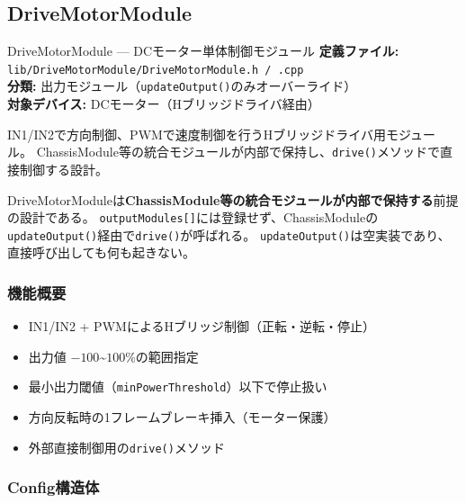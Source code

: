 \subsection{DriveMotorModule}

\begin{apibox}{DriveMotorModule --- DCモーター単体制御モジュール}
\textbf{定義ファイル:} \texttt{lib/DriveMotorModule/DriveMotorModule.h / .cpp}\\
\textbf{分類:} 出力モジュール（\texttt{updateOutput()}のみオーバーライド）\\
\textbf{対象デバイス:} DCモーター（Hブリッジドライバ経由）

IN1/IN2で方向制御、PWMで速度制御を行うHブリッジドライバ用モジュール。
ChassisModule等の統合モジュールが内部で保持し、\texttt{drive()}メソッドで直接制御する設計。
\end{apibox}

\begin{cautionbox}
DriveMotorModuleは\textbf{ChassisModule等の統合モジュールが内部で保持する}前提の設計である。
\texttt{outputModules[]}には登録せず、ChassisModuleの\texttt{updateOutput()}経由で\texttt{drive()}が呼ばれる。
\texttt{updateOutput()}は空実装であり、直接呼び出しても何も起きない。
\end{cautionbox}

\subsubsection{機能概要}

\begin{itemize}
    \item IN1/IN2 + PWMによるHブリッジ制御（正転・逆転・停止）
    \item 出力値 $-100$\textasciitilde$100$\%の範囲指定
    \item 最小出力閾値（\texttt{minPowerThreshold}）以下で停止扱い
    \item 方向反転時の1フレームブレーキ挿入（モーター保護）
    \item 外部直接制御用の\texttt{drive()}メソッド
\end{itemize}

\subsubsection{Config構造体}

